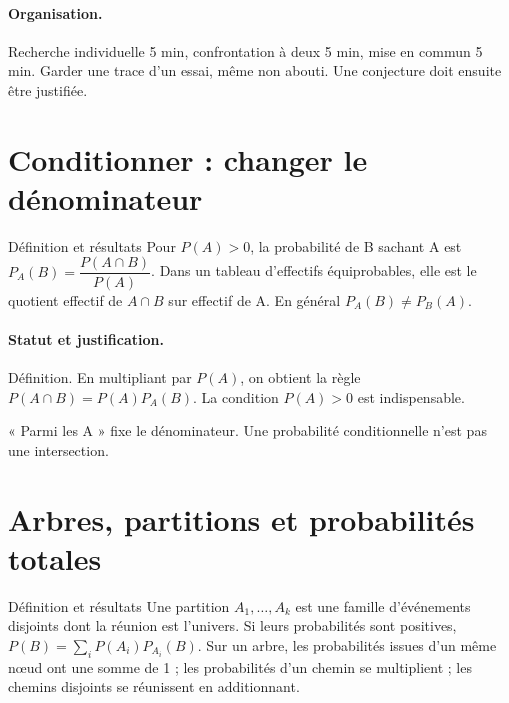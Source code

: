 \paragraph{Organisation.} Recherche individuelle 5 min, confrontation à deux 5 min, mise en commun 5 min. Garder une trace d’un essai, même non abouti. Une conjecture doit ensuite être justifiée.
\section{Conditionner : changer le dénominateur}\label{C05-U1}
\begin{repere}{Définition et résultats}
Pour $P(A)>0$, la probabilité de B sachant A est $P_A(B)=\dfrac{P(A\cap B)}{P(A)}$. Dans un tableau d’effectifs équiprobables, elle est le quotient effectif de $A\cap B$ sur effectif de A. En général $P_A(B)\ne P_B(A)$.
\end{repere}
\paragraph{Statut et justification.} Définition. En multipliant par $P(A)$, on obtient la règle $P(A\cap B)=P(A)P_A(B)$. La condition $P(A)>0$ est indispensable.
\label{C05-EX1}
\begin{erreur}« Parmi les A » fixe le dénominateur. Une probabilité conditionnelle n’est pas une intersection.\end{erreur}
\label{C05-AP1}
\section{Arbres, partitions et probabilités totales}\label{C05-U2}
\begin{repere}{Définition et résultats}
Une partition $A_1,\ldots,A_k$ est une famille d’événements disjoints dont la réunion est l’univers. Si leurs probabilités sont positives, $P(B)=\sum_iP(A_i)P_{A_i}(B)$. Sur un arbre, les probabilités issues d’un même nœud ont une somme de 1 ; les probabilités d’un chemin se multiplient ; les chemins disjoints se réunissent en additionnant.
\end{repere}
